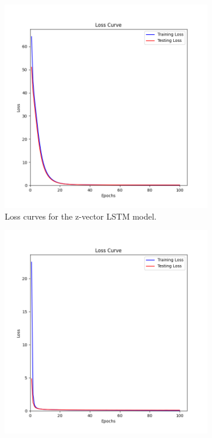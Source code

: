\documentclass{l4proj}
\begin{document}
\begin{appendices}
\begin{figure}
    \centering
    \begin{subfigure}[b]{0.45\textwidth}
        \includegraphics[width=1\linewidth]{images/loss_z.png}
        \caption{Loss curves for the z-vector LSTM model.}
        \label{fig:loss_z_vec}
    \end{subfigure}
    \begin{subfigure}[b]{0.45\textwidth}
        \includegraphics[width=1\linewidth]{images/loss_h.png}

\end{subfigure}
\end{figure}
\end{appendices}
\end{document}
